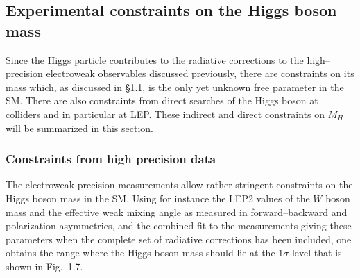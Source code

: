 \newpage
\subsection{Experimental constraints on the Higgs boson mass}

Since the Higgs particle contributes to the radiative corrections to the 
high--precision electroweak observables discussed previously, there are 
constraints on its mass which, as discussed in \S1.1, is 
the only yet unknown free parameter in the SM. There are also constraints from
direct searches of the Higgs boson at colliders and in particular at LEP. 
These indirect and direct constraints on $M_H$ will be summarized in this 
section. 

\subsubsection{Constraints from high precision data}

The electroweak precision measurements allow rather stringent constraints on
the Higgs boson mass in the SM. Using for instance the LEP2 values of the $W$
boson mass and the effective weak mixing angle as measured in forward--backward
and polarization asymmetries, and the combined fit to the measurements giving
these parameters when the complete set of radiative corrections has been
included, one obtains the range where the Higgs boson mass should lie at the
$1\sigma$ level that is shown in Fig.~1.7.\s

\begin{figure}[htpb]
\begin{center}
\vspace*{-.1mm}
\mbox{
\hspace*{2cm}
 }
\end{center}
\vspace*{-.9mm}
\label{fig:ewwg2002pulls}
\vspace*{-1mm}
\end{figure}

